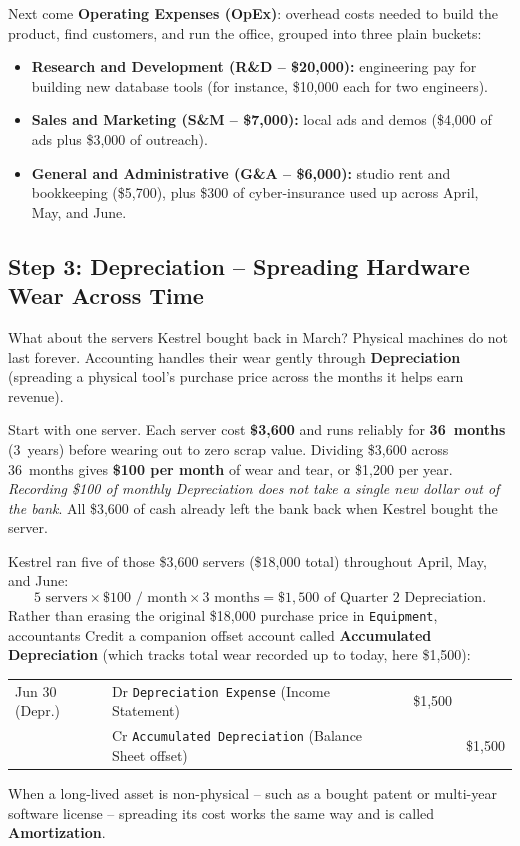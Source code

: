 Next come \textbf{Operating Expenses (OpEx)}: overhead costs needed to build the product, find customers, and run the office, grouped into three plain buckets:
\begin{itemize}
  \item \textbf{Research and Development (R\&D -- \$20,000):} engineering pay for building new database tools (for instance, \$10,000 each for two engineers).
  \item \textbf{Sales and Marketing (S\&M -- \$7,000):} local ads and demos (\$4,000 of ads plus \$3,000 of outreach).
  \item \textbf{General and Administrative (G\&A -- \$6,000):} studio rent and bookkeeping (\$5,700), plus \$300 of cyber-insurance used up across April, May, and June.
\end{itemize}

\subsection*{Step 3: Depreciation -- Spreading Hardware Wear Across Time}

What about the servers Kestrel bought back in March? Physical machines do not last forever. Accounting handles their wear gently through \textbf{Depreciation} (spreading a physical tool's purchase price across the months it helps earn revenue).

Start with one server. Each server cost \textbf{\$3,600} and runs reliably for \textbf{36~months} (3~years) before wearing out to zero scrap value. Dividing \$3,600 across 36~months gives \textbf{\$100 per month} of wear and tear, or \$1,200 per year. \emph{Recording \$100 of monthly Depreciation does not take a single new dollar out of the bank}. All \$3,600 of cash already left the bank back when Kestrel bought the server.

Kestrel ran five of those \$3,600 servers (\$18,000 total) throughout April, May, and June:
\[
  5\text{ servers} \times \$100\text{ / month} \times 3\text{ months} = \$1{,}500\text{ of Quarter 2 Depreciation}.
\]
Rather than erasing the original \$18,000 purchase price in \texttt{Equipment}, accountants Credit a companion offset account called \textbf{Accumulated Depreciation} (which tracks total wear recorded up to today, here \$1,500):
\begin{center}
\small
\begin{tabular}{@{}llrr@{}}
Jun 30 (Depr.) & Dr \texttt{Depreciation Expense} (Income Statement) & \$1,500 & \\
               & \quad Cr \texttt{Accumulated Depreciation} (Balance Sheet offset) & & \$1,500
\end{tabular}
\end{center}
When a long-lived asset is non-physical -- such as a bought patent or multi-year software license -- spreading its cost works the same way and is called \textbf{Amortization}.

